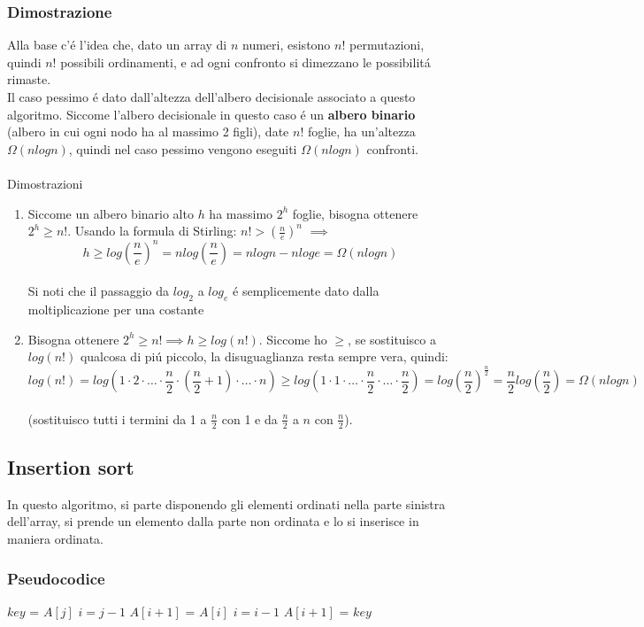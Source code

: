 \documentclass{article}
\begin{document}
\subsubsection{Dimostrazione}
Alla base c'é l'idea che, dato un array di $n$ numeri, esistono $n!$ permutazioni, quindi $n!$ possibili ordinamenti, e ad ogni confronto si dimezzano le possibilitá rimaste.\\
Il caso pessimo é dato dall'altezza dell'albero decisionale associato a questo algoritmo. Siccome l'albero decisionale in questo caso é un \textbf{albero binario} (albero in cui ogni nodo ha al massimo 2 figli), date $n!$ foglie, ha un'altezza $\Omega(nlogn)$, quindi nel caso pessimo vengono eseguiti $\Omega(nlogn)$ confronti.\\\\
Dimostrazioni
\begin{enumerate}
	\item Siccome un albero binario alto $h$ ha massimo $2^h$ foglie, bisogna ottenere $\displaystyle 2^h \ge n!$. Usando la formula di Stirling: $n! > (\frac{n}{e})^n$ $\implies$ $$h \ge log{(\frac{n}{e})^n} = nlog(\frac{n}{e}) = nlogn -nloge = \Omega(nlogn)$$\\
	Si noti che il passaggio da $log_2$ a $log_e$ é semplicemente dato dalla moltiplicazione per una costante
	\item Bisogna ottenere $2^h \ge n! \implies h \ge log(n!)$. Siccome ho $\ge$, se sostituisco a $log(n!)$ qualcosa di piú piccolo, la disuguaglianza resta sempre vera, quindi: $$\displaystyle log(n!) = log(1 \cdot 2 \cdot \dots \cdot \frac{n}{2} \cdot (\frac{n}{2}+1) \cdot \dots \cdot n) \ge log(1 \cdot 1 \cdot \dots \cdot \frac{n}{2} \cdot \dots \cdot \frac{n}{2}) = log(\frac{n}{2})^{\frac{n}{2}} = \frac{n}{2}log(\frac{n}{2}) = \Omega(nlogn)$$\\
	(sostituisco tutti i termini da 1 a $\frac{n}{2}$ con 1 e da $\frac{n}{2}$ a $n$ con $\frac{n}{2}$).
\end{enumerate}

\subsection{Insertion sort}
In questo algoritmo, si parte disponendo gli elementi ordinati nella parte sinistra dell'array, si prende un elemento dalla parte non ordinata e lo si inserisce in maniera ordinata.

\subsubsection{Pseudocodice}
\begin{algorithmic}
	\State $key$ = $A[j]$
	\State $i = j - 1$	
	 
 		\State $A[i+1]$ = $A[i]$ 
		\State $i = i - 1$
	\EndWhile
	\State $A[i+1]$ = $key$
\EndFor
\end{algorithmic}
\end{document}
